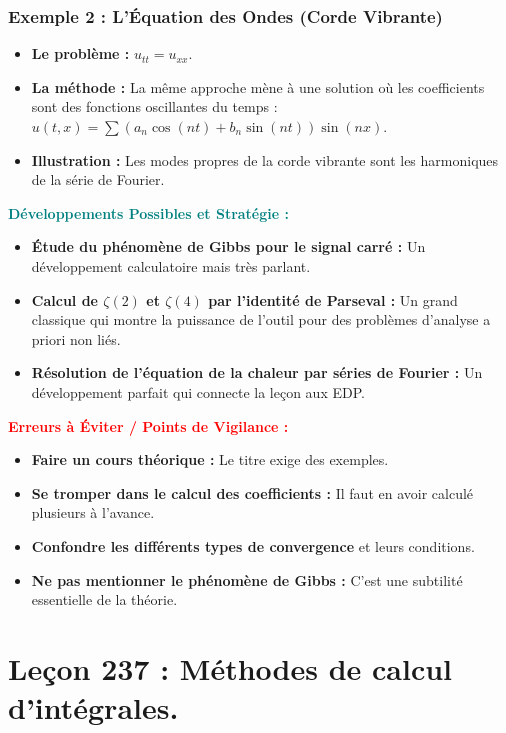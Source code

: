 \documentclass[12pt, a4paper, parskip=full]{report}
\theoremstyle{agregstyle}
\newenvironment{developpements}
  {\par\medskip\noindent\begin{oframed}\noindent\textbf{\textcolor{teal}{Développements Possibles et Stratégie :}}}
  {\end{oframed}\par\medskip}
\newenvironment{erreurs}
  {\par\medskip\noindent\begin{oframed}\noindent\textbf{\textcolor{red}{Erreurs à Éviter / Points de Vigilance :}}}
  {\end{oframed}\par\medskip}
\begin{document}
\subsection{Exemple 2 : L'Équation des Ondes (Corde Vibrante)}
\begin{itemize}
    \item \textbf{Le problème :} $u_{tt} = u_{xx}$.
    \item \textbf{La méthode :} La même approche mène à une solution où les coefficients sont des fonctions oscillantes du temps : $u(t,x) = \sum (a_n \cos(nt) + b_n \sin(nt))\sin(nx)$.
    \item \textbf{Illustration :} Les modes propres de la corde vibrante sont les harmoniques de la série de Fourier.
\end{itemize}

\begin{developpements}
    \begin{itemize}
        \item \textbf{Étude du phénomène de Gibbs pour le signal carré :} Un développement calculatoire mais très parlant.
        \item \textbf{Calcul de $\zeta(2)$ et $\zeta(4)$ par l'identité de Parseval :} Un grand classique qui montre la puissance de l'outil pour des problèmes d'analyse a priori non liés.
        \item \textbf{Résolution de l'équation de la chaleur par séries de Fourier :} Un développement parfait qui connecte la leçon aux EDP.
    \end{itemize}
\end{developpements}

\begin{erreurs}
    \begin{itemize}
        \item \textbf{Faire un cours théorique :} Le titre exige des exemples.
        \item \textbf{Se tromper dans le calcul des coefficients :} Il faut en avoir calculé plusieurs à l'avance.
        \item \textbf{Confondre les différents types de convergence} et leurs conditions.
        \item \textbf{Ne pas mentionner le phénomène de Gibbs :} C'est une subtilité essentielle de la théorie.
    \end{itemize}
\end{erreurs}
\chapter{Leçon 237 : Méthodes de calcul d'intégrales.}
\end{document}
